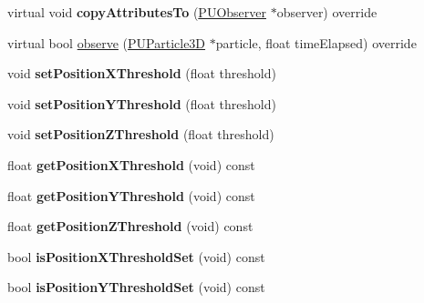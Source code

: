 \begin{DoxyCompactItemize}
\mbox{\label{classPUOnPositionObserver_aeac76175c372c1e25abef1ec3e5e25bb}} 
virtual void {\bfseries copy\+Attributes\+To} (\hyperlink{classPUObserver}{P\+U\+Observer} $\ast$observer) override
\item 
virtual bool \hyperlink{classPUOnPositionObserver_a2c47b5b4b29896c659d4dea79d8360f1}{observe} (\hyperlink{structPUParticle3D}{P\+U\+Particle3D} $\ast$particle, float time\+Elapsed) override
\item 
\mbox{\label{classPUOnPositionObserver_a3d7b7abe52c6a99dc900bb6d2a3eccde}} 
void {\bfseries set\+Position\+X\+Threshold} (float threshold)
\item 
\mbox{\label{classPUOnPositionObserver_af5bb78d007e7c328158275ab72f46914}} 
void {\bfseries set\+Position\+Y\+Threshold} (float threshold)
\item 
\mbox{\label{classPUOnPositionObserver_a39970af06ca89eed8ef77951722444e9}} 
void {\bfseries set\+Position\+Z\+Threshold} (float threshold)
\item 
\mbox{\label{classPUOnPositionObserver_ae949a2e18d7f37632c1a936a0f696ecd}} 
float {\bfseries get\+Position\+X\+Threshold} (void) const
\item 
\mbox{\label{classPUOnPositionObserver_a57a83e01d729f0dcfd06d675890e6e1c}} 
float {\bfseries get\+Position\+Y\+Threshold} (void) const
\item 
\mbox{\label{classPUOnPositionObserver_a025bb94eb83e297758f1770de8d505d6}} 
float {\bfseries get\+Position\+Z\+Threshold} (void) const
\item 
\mbox{\label{classPUOnPositionObserver_aec6fee9ab70e5ef445a42f7ceff0d99a}} 
bool {\bfseries is\+Position\+X\+Threshold\+Set} (void) const
\item 
\mbox{\label{classPUOnPositionObserver_a70f6848653b8c31af01325f125159970}} 
bool {\bfseries is\+Position\+Y\+Threshold\+Set} (void) const
\item 

\end{DoxyCompactItemize}
